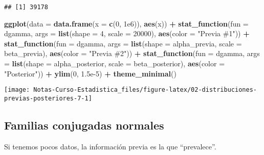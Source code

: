 \documentclass[
  12pt,
]{book}
\newenvironment{Shaded}{\begin{snugshade}}{\end{snugshade}}
\newcommand{\DataTypeTok}[1]{\textcolor[rgb]{0.13,0.29,0.53}{#1}}
\newcommand{\DecValTok}[1]{\textcolor[rgb]{0.00,0.00,0.81}{#1}}
\newcommand{\FloatTok}[1]{\textcolor[rgb]{0.00,0.00,0.81}{#1}}
\newcommand{\KeywordTok}[1]{\textcolor[rgb]{0.13,0.29,0.53}{\textbf{#1}}}
\newcommand{\NormalTok}[1]{#1}
\newcommand{\OperatorTok}[1]{\textcolor[rgb]{0.81,0.36,0.00}{\textbf{#1}}}
\newcommand{\StringTok}[1]{\textcolor[rgb]{0.31,0.60,0.02}{#1}}
\begin{document}
\begin{verbatim}
## [1] 39178
\end{verbatim}

\begin{Shaded}
\begin{Highlighting}[]
\KeywordTok{ggplot}\NormalTok{(}\DataTypeTok{data =} \KeywordTok{data.frame}\NormalTok{(}\DataTypeTok{x =} \KeywordTok{c}\NormalTok{(}\DecValTok{0}\NormalTok{, }\FloatTok{1e6}\NormalTok{)), }\KeywordTok{aes}\NormalTok{(x)) }\OperatorTok{+}
\StringTok{  }\KeywordTok{stat\_function}\NormalTok{(}\DataTypeTok{fun =}\NormalTok{ dgamma, }\DataTypeTok{args =} \KeywordTok{list}\NormalTok{(}\DataTypeTok{shape =} \DecValTok{4}\NormalTok{, }\DataTypeTok{scale =} \DecValTok{20000}\NormalTok{), }\KeywordTok{aes}\NormalTok{(}\DataTypeTok{color =} \StringTok{"Previa \#1"}\NormalTok{)) }\OperatorTok{+}
\StringTok{  }\KeywordTok{stat\_function}\NormalTok{(}\DataTypeTok{fun =}\NormalTok{ dgamma, }\DataTypeTok{args =} \KeywordTok{list}\NormalTok{(}\DataTypeTok{shape =}\NormalTok{ alpha\_previa, }\DataTypeTok{scale =}\NormalTok{ beta\_previa), }\KeywordTok{aes}\NormalTok{(}\DataTypeTok{color =} \StringTok{"Previa \#2"}\NormalTok{)) }\OperatorTok{+}
\StringTok{  }\KeywordTok{stat\_function}\NormalTok{(}\DataTypeTok{fun =}\NormalTok{ dgamma, }\DataTypeTok{args =} \KeywordTok{list}\NormalTok{(}\DataTypeTok{shape =}\NormalTok{ alpha\_posterior, }\DataTypeTok{scale =}\NormalTok{ beta\_posterior), }\KeywordTok{aes}\NormalTok{(}\DataTypeTok{color =} \StringTok{"Posterior"}\NormalTok{)) }\OperatorTok{+}
\StringTok{  }\KeywordTok{ylim}\NormalTok{(}\DecValTok{0}\NormalTok{, }\FloatTok{1.5e{-}5}\NormalTok{) }\OperatorTok{+}
\StringTok{  }\KeywordTok{theme\_minimal}\NormalTok{()}
\end{Highlighting}
\end{Shaded}

\begin{center}\texttt{[image: Notas-Curso-Estadistica\_files/figure-latex/02-distribuciones-previas-posteriores-7-1]} \end{center}

\hypertarget{familias-conjugadas-normales}{%
\subsection{Familias conjugadas normales}\label{familias-conjugadas-normales}}

Si tenemos pocos datos, la información previa es la que ``prevalece''.
\end{document}
